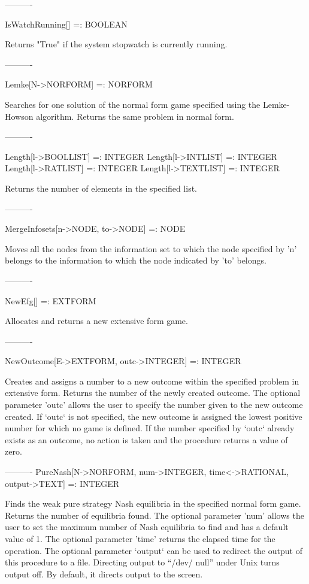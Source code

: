 ----------

IsWatchRunning[] =: BOOLEAN

	Returns "True" if the system stopwatch is currently running.

----------

Lemke[N->NORFORM] =: NORFORM

	Searches for one solution of the normal form game specified using the
Lemke-Howson algorithm.  Returns the same problem in normal form.	

----------

Length[l->BOOLLIST] =: INTEGER
Length[l->INTLIST] =: INTEGER
Length[l->RATLIST] =: INTEGER
Length[l->TEXTLIST] =: INTEGER

	Returns the number of elements in the specified list.

----------

MergeInfosets[n->NODE, to->NODE] =: NODE

	Moves all the nodes from the information set to which the node
specified by 'n' belongs to the information to which the node indicated by 'to'
belongs.

----------

NewEfg[] =: EXTFORM

	Allocates and returns a new extensive form game.

----------

NewOutcome[E->EXTFORM, {outc->INTEGER}] =: INTEGER

	Creates and assigns a number to a new outcome within the specified 
problem in extensive form.  Returns the number of the newly created outcome.
The optional parameter 'outc' allows the user to specify the number given to 
the new outcome created.  If `outc` is not specified, the new outcome is
assigned the lowest positive number for which no game is defined.  If the 
number specified by `outc` already exists as an outcome, no action is taken and
the procedure returns a value of zero.

----------
PureNash[N->NORFORM, {num->INTEGER}, {time<->RATIONAL}, {output->TEXT}]
	 =: INTEGER

	Finds the weak pure strategy Nash equilibria in the specified normal 
form game.  Returns the number of equilibria found.  The optional parameter 
'num' allows the user to set the maximum number of Nash equilibria to find and 
has a default value of 1.  The optional parameter 'time' returns the elapsed 
time for the operation.  The optional parameter `output` can be used to
redirect the output of this procedure to a file.  Directing output to ``/dev/
null'' under Unix turns output off.  By default, it directs output to the
screen.

